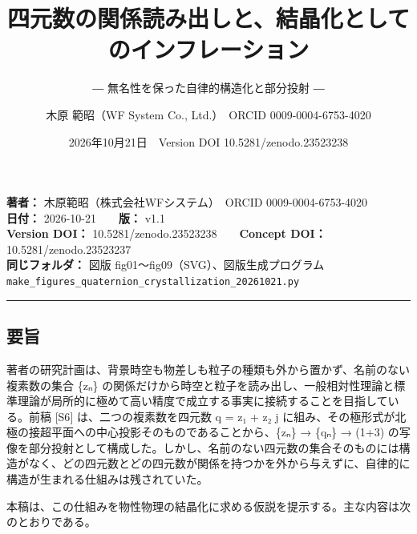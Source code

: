\documentclass[
  a4paper,
]{ltjsarticle}
\title{四元数の関係読み出しと、結晶化としてのインフレーション}
\subtitle{― 無名性を保った自律的構造化と部分投射 ―}
\author{木原 範昭（WF System Co., Ltd.）　ORCID 0009-0004-6753-4020}
\date{2026年10月21日　Version DOI 10.5281/zenodo.23523238}
\begin{document}
\maketitle

\textbf{著者：} 木原範昭（株式会社WFシステム）　ORCID
0009-0004-6753-4020\\
\textbf{日付：} 2026-10-21　　\textbf{版：} v1.1\\
\textbf{Version DOI：} 10.5281/zenodo.23523238　　\textbf{Concept DOI：}
10.5281/zenodo.23523237\\
\textbf{同じフォルダ：} 図版 fig01〜fig09（SVG）、図版生成プログラム
\texttt{make\_\allowbreak{}figures\_\allowbreak{}quaternion\_\allowbreak{}crystallization\_\allowbreak{}20261021.py}

\begin{center}\rule{0.5\linewidth}{0.5pt}\end{center}

\subsection{要旨}\label{ux8981ux65e8}

著者の研究計画は、背景時空も物差しも粒子の種類も外から置かず、名前のない複素数の集合
\{zₙ\}
の関係だけから時空と粒子を読み出し、一般相対性理論と標準理論が局所的に極めて高い精度で成立する事実に接続することを目指している。前稿
{[}S6{]} は、二つの複素数を四元数 q = z₁ + z₂ j
に組み、その極形式が北極の接超平面への中心投影そのものであることから、\{zₙ\}
→ \{qₙ\} → (1+3)
の写像を部分投射として構成した。しかし、名前のない四元数の集合そのものには構造がなく、どの四元数とどの四元数が関係を持つかを外から与えずに、自律的に構造が生まれる仕組みは残されていた。

本稿は、この仕組みを物性物理の結晶化に求める仮説を提示する。主な内容は次のとおりである。
\end{document}

